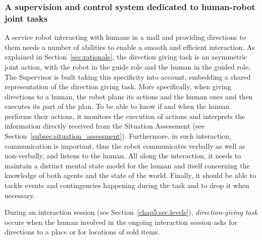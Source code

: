 \documentclass[a4paper,11pt,twoside]{StyleThese}
\begin{document}
\subsubsection{A supervision and control system dedicated to human-robot joint tasks}
A service robot interacting with humans in a mall and providing directions to them needs a number of abilities to enable a smooth and efficient interaction. As explained in Section~\ref{sec:rationale}, the direction giving task is an asymmetric joint action, with the robot in the guide role and the human in the guided role. The Supervisor is built taking this specificity into account, embedding a shared representation of the direction giving task. More specifically, when giving directions to a human, the robot plans its actions and the human ones and then executes its part of the plan. To be able to know if and when the human performs their actions, it monitors the execution of actions and interprets the information directly received from the Situation Assessment (see Section~\ref{subsec:situation_assessment}). Furthermore, in such interaction, communication is important, thus the robot communicates verbally as well as non-verbally, and listens to the human. All along the interaction, it needs to maintain a distinct mental state model for the human and itself concerning the knowledge of both agents and the state of the world. Finally, it should be able to tackle events and contingencies happening during the task and to drop it when necessary.

During an interaction session (see Section~\ref{chap5:sec:levels}), \emph{direction-giving task} occurs when the human involved in the ongoing interaction session  asks for directions to a place or for locations of sold items. 
\end{document}
